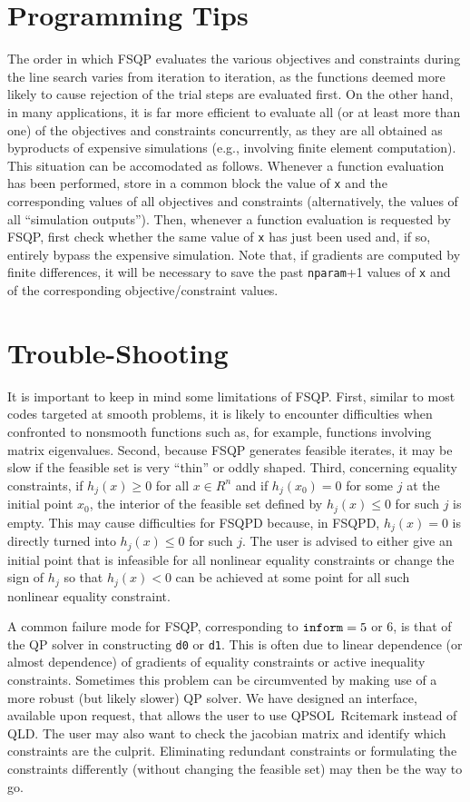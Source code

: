\section{Programming Tips}
\label{tips}
\noindent
The order in which FSQP evaluates the various objectives and
constraints during the line search varies from iteration to
iteration, as the functions deemed more likely to cause rejection of
the trial steps are evaluated first.  On the other hand, in
many applications, it is far more efficient to evaluate all
(or at least more than one) of the objectives and constraints concurrently,
as they are all obtained as byproducts of expensive simulations
(e.g., involving finite element computation).  This situation
can be accomodated as follows.  Whenever a function evaluation
has been performed, store in a common block the value of {\tt x} 
and the corresponding values of all objectives and constraints (alternatively,
the values of all ``simulation outputs'').  Then, whenever a function
evaluation is requested by FSQP, first check whether the same value of 
{\tt x} has just been used and, if so, entirely bypass the expensive
simulation.   Note that, if gradients are computed by finite differences,
it will be necessary to save the past {\tt nparam}+1 values of {\tt x}
and of the corresponding objective/constraint values.

\section{Trouble-Shooting}
\label{trouble}
\noindent It is important to keep in mind some limitations of FSQP.
First, similar to most codes targeted at smooth problems, it is
likely to encounter difficulties when confronted to nonsmooth
functions such as, for example, functions involving matrix
eigenvalues. Second, because FSQP generates feasible iterates, it may
be slow if the feasible set is very ``thin'' or oddly shaped. 
Third, concerning equality constraints, if $h_j(x)\geq 0$ for all 
$x\in R^n$ and if $h_j(x_0)=0$
for some $j$ at the initial point $x_0$, the interior of the feasible set
defined by $h_j(x)\leq 0$ for such $j$ is empty. This may cause
difficulties for FSQPD because, in FSQPD, $h_j(x)=0$ is directly 
turned into $h_j(x)\leq 0$ for such $j$.
The user is advised to either give an initial point
that is infeasible for all nonlinear equality constraints or change
the sign of $h_j$ so that $h_j(x)<0$ can be achieved at some point
for all such nonlinear equality constraint.

A common failure mode for FSQP, corresponding to ${\tt inform}=5$ or 6,
is that of the QP solver in constructing {\tt d0} or {\tt d1}.
This is often due to linear dependence (or almost dependence) 
of gradients of equality constraints or active inequality constraints.
Sometimes this problem can be circumvented by making use of a more
robust (but likely slower) QP solver.  We have designed an interface,
available upon request, that allows the user to use QPSOL\Lspace {}\
Rcitemark \Rspace{}
instead of QLD. The user may also want to
check the jacobian matrix and identify which constraints are the
culprit.  Eliminating redundant constraints or formulating the constraints 
differently (without changing the feasible set) may then be the way to go.

